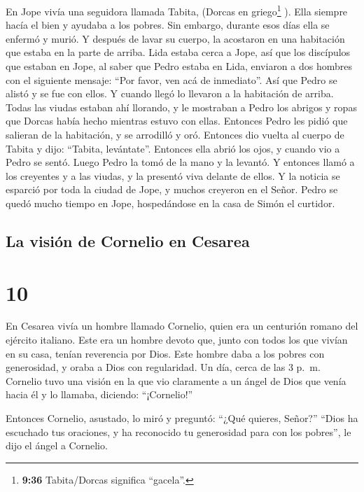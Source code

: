  En Jope vivía una seguidora llamada Tabita, (Dorcas en
griego\footnote{\textbf{9:36} Tabita/Dorcas significa ``gacela''.} ).
Ella siempre hacía el bien y ayudaba a los pobres.  Sin
embargo, durante esos días ella se enfermó y murió. Y después de lavar
su cuerpo, la acostaron en una habitación que estaba en la parte de
arriba.  Lida estaba cerca a Jope, así que los discípulos
que estaban en Jope, al saber que Pedro estaba en Lida, enviaron a dos
hombres con el siguiente mensaje: ``Por favor, ven acá de inmediato''.
 Así que Pedro se alistó y se fue con ellos. Y cuando
llegó lo llevaron a la habitación de arriba. Todas las viudas estaban
ahí llorando, y le mostraban a Pedro los abrigos y ropas que Dorcas
había hecho mientras estuvo con ellas.  Entonces Pedro
les pidió que salieran de la habitación, y se arrodilló y oró. Entonces
dio vuelta al cuerpo de Tabita y dijo: ``Tabita, levántate''. Entonces
ella abrió los ojos, y cuando vio a Pedro se sentó. 
Luego Pedro la tomó de la mano y la levantó. Y entonces llamó a los
creyentes y a las viudas, y la presentó viva delante de ellos.
 Y la noticia se esparció por toda la ciudad de Jope, y
muchos creyeron en el Señor.  Pedro se quedó mucho tiempo
en Jope, hospedándose en la casa de Simón el curtidor.

\hypertarget{la-visiuxf3n-de-cornelio-en-cesarea}{%
\subsection{La visión de Cornelio en
Cesarea}\label{la-visiuxf3n-de-cornelio-en-cesarea}}

\hypertarget{section-9}{%
\section{10}\label{section-9}}

 En Cesarea vivía un hombre llamado Cornelio, quien era un
centurión romano del ejército italiano.  Este era un
hombre devoto que, junto con todos los que vivían en su casa, tenían
reverencia por Dios. Este hombre daba a los pobres con generosidad, y
oraba a Dios con regularidad.  Un día, cerca de las 3
p.~m. Cornelio tuvo una visión en la que vio claramente a un ángel de
Dios que venía hacia él y lo llamaba, diciendo: ``¡Cornelio!''

 Entonces Cornelio, asustado, lo miró y preguntó: ``¿Qué
quieres, Señor?'' ``Dios ha escuchado tus oraciones, y ha reconocido tu
generosidad para con los pobres'', le dijo el ángel a Cornelio.

